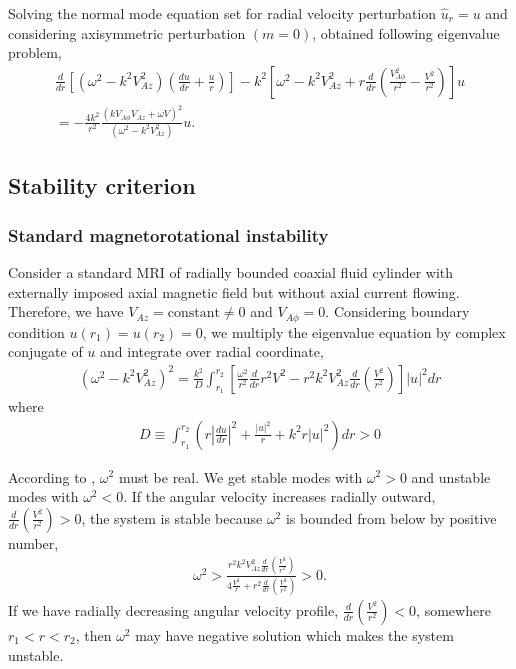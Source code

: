 \documentclass{jfm}
\begin{document}
Solving the normal mode equation set for radial velocity perturbation 
$\hat{u}_r = u$ and considering axisymmetric perturbation $(m=0)$, 
\cite{Acheson1973a} obtained following eigenvalue problem,
\begin{align}
    \frac{d}{dr}\left[(\omega^2-k^2 V_{Az}^2)\left(\frac{du}{dr}+\frac{u}{r}\right)\right]-k^2\left[\omega^2-k^2 V_{Az}^2+r\frac{d}{dr}\left(\frac{V_{A\phi}^2}{r^2}-\frac{V^2}{r^2}\right)\right]u \nonumber \\
    = -\frac{4 k^2}{r^2}\frac{(k V_{A\phi} V_{Az}+\omega V)^2}{(\omega^2-k^2 V_{Az}^2)} u.
\end{align}


%
%
\subsection{Stability criterion}

\subsubsection{Standard magnetorotational instability}

Consider a standard MRI of radially bounded coaxial fluid cylinder with 
externally imposed axial magnetic field but without axial current flowing. 
Therefore, we have $V_{Az} = \text{constant} \neq 0$ and 
$V_{A\phi} = 0$. Considering boundary condition 
$u(r_1)=u(r_2)=0$, we multiply the eigenvalue equation by complex conjugate 
of $u$ and integrate over radial coordinate,
\begin{align}
    (\omega^2-k^2 V_{Az}^2)^2 = \frac{k^2}{D}\int_{r_1}^{r_2}\left[\frac{\omega^2}{r^2}\frac{d}{dr}r^2V^2 -r^2 k^2 V_{Az}^2 \frac{d}{dr}\left(\frac{V^2}{r^2}\right)\right]|u|^2 dr
\end{align}   
where 
\begin{align}
    D\equiv \int_{r_1}^{r_2}\left(r \left|\frac{du}{dr}\right|^2 +\frac{|u|^2}{r}+k^2 r |u|^2 \right) dr >0
\end{align}

According to \cite{Chandrasekhar1960}, $\omega^2$ must be real. We get stable 
modes with $\omega^2>0$ and unstable modes with $\omega^2<0$. If the angular 
velocity increases radially outward, $\frac{d}{dr}\left(\frac{V^2}{r^2}\right)>0$, 
the system is stable because $\omega^2$ is bounded from below by positive number, 
\begin{align}
    \omega^2>\frac{r^2k^2 V_{Az}^2 \frac{d}{dr}\left(\frac{V^2}{r^2}\right)}{4\frac{V^2}{r}+r^2\frac{d}{dr}\left(\frac{V^2}{r^2}\right)}>0.
\end{align}
If we have radially decreasing angular velocity profile, 
$\frac{d}{dr}\left(\frac{V^2}{r^2}\right)<0$, somewhere $r_1<r<r_2$, then 
$\omega^2$ may have negative solution which makes the system unstable.
\end{document}
